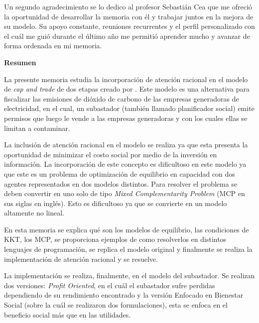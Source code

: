 Un segundo agradecimiento se lo dedico al profesor Sebastián Cea que me ofreció la oportunidad de desarrollar la memoria con él y trabajar juntos en la mejora de su modelo. Su apoyo constante, reuniones recurrentes y el perfil personalizado con el cuál me guió durante el último año me permitió aprender mucho y avanzar de forma ordenada en mi memoria. 
\vspace{2.5mm}




  \cleardoublepage
   
  \begin{center} \Large \textbf{Resumen} \end{center}
La presente memoria estudia la incorporación de atención racional en el modelo de \textit{cap and trade} de dos etapas creado por . Este modelo es una alternativa para fiscalizar las emisiones de dióxido de carbono de las empresas generadoras de electricidad, en el cual, un subastador (también llamado planificador social) emite permisos que luego le vende a las empresas generadoras y con los cuales ellas se limitan a contaminar.
\vspace{2.5mm}

La inclusión de atención racional en el modelo se realiza ya que esta presenta la oportunidad de minimizar el costo social por medio de la inversión en información. La incorporación de este concepto es dificultoso en este modelo ya que este es un problema de optimización de equilibrio en capacidad con dos agentes representados en dos modelos distintos. Para resolver el problema se deben convertir en uno solo de tipo \textit{Mixed Complementarity Problem} (MCP en sus siglas en inglés). Esto es dificultoso ya que se convierte en un modelo altamente no lineal.
\vspace{2.5mm}

En esta memoria se explica qué son los modelos de equilibrio,  las condiciones de KKT, los MCP, se proporciona ejemplos de como resolverlos en distintos lenguajes de programación, se replica el modelo original y finalmente se realiza la implementación de atención racional y se resuelve.
\vspace{2.5mm}

La implementación se realiza, finalmente, en el modelo del subastador. Se realizan dos versiones: \textit{Profit Oriented}, en el cuál el subastador sufre perdidas dependiendo de su rendimiento encontrado y la versión Enfocado en Bienestar Social (sobre la cuál se realizaron dos formulaciones), esta se enfoca en el beneficio social más que en las utilidades. 
\vspace{2.5mm}

